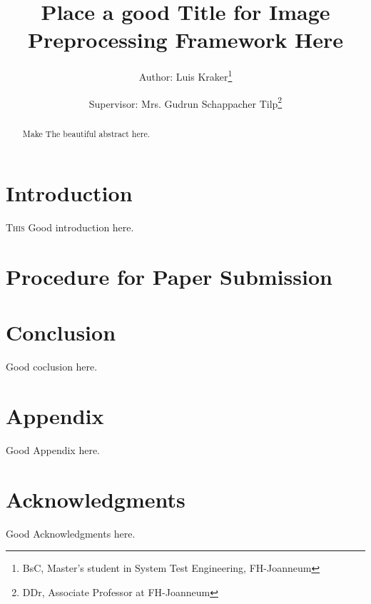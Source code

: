 \documentclass[journal ]{new-aiaa}
\title{Place a good Title for Image Preprocessing Framework Here}
\author{Author: Luis Kraker\footnote{BsC, Master's student in System Test Engineering, FH-Joanneum}}
\affil{FH-Joanneum, Graz 8020, Austria}
\author{Supervisor: Mrs. Gudrun Schappacher Tilp\footnote{DDr, Associate Professor at FH-Joanneum}}
\affil{FH-Joanneum, Graz 8020, Austria}
\begin{document}
\maketitle

\begin{abstract}
Make The beautiful abstract here.
\end{abstract}



\section{Introduction}
\lettrine{T}{his} Good introduction here.


\section{Procedure for Paper Submission}


\section{Conclusion}
Good coclusion here.

\section*{Appendix}

Good Appendix here.

\section*{Acknowledgments}
Good Acknowledgments here.


\end{document}
